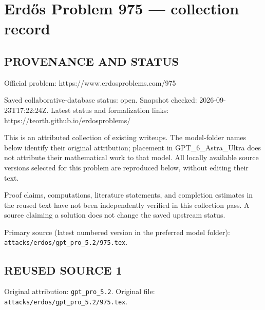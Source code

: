 \section*{Erd\H{o}s Problem 975 --- collection record}

\subsection*{PROVENANCE AND STATUS}
Official problem: https://www.erdosproblems.com/975

Saved collaborative-database status: open.
Snapshot checked: 2026-09-23T17:22:24Z.
Latest status and formalization links: https://teorth.github.io/erdosproblems/

This is an attributed collection of existing writeups. The model-folder names below identify their original attribution; placement in GPT\_6\_Astra\_Ultra does not attribute their mathematical work to that model. All locally available source versions selected for this problem are reproduced below, without editing their text.

Proof claims, computations, literature statements, and completion estimates in the reused text have not been independently verified in this collection pass. A source claiming a solution does not change the saved upstream status.

Primary source (latest numbered version in the preferred model folder): \texttt{attacks/erdos/gpt\_pro\_5.2/975.tex}.

\subsection*{REUSED SOURCE 1}
Original attribution: \texttt{gpt\_pro\_5.2}.
Original file: \texttt{attacks/erdos/gpt\_pro\_5.2/975.tex}.


